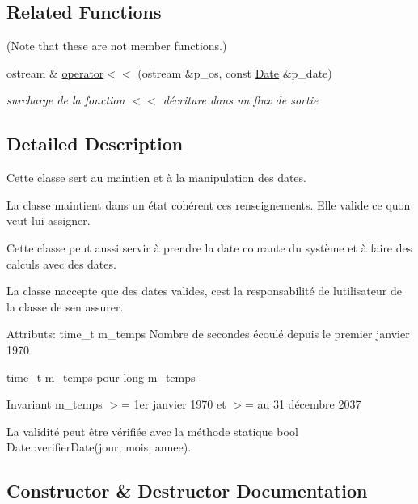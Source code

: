 \subsection*{Related Functions}
(Note that these are not member functions.) \begin{DoxyCompactItemize}
\item 
ostream \& \hyperlink{classutil_1_1Date_a3b88f9a1692395518a45b282a19f10e8}{operator$<$$<$} (ostream \&p\+\_\+os, const \hyperlink{classutil_1_1Date}{Date} \&p\+\_\+date)
\begin{DoxyCompactList}\small\item\em surcharge de la fonction $<$$<$ d\textquotesingle{}écriture dans un flux de sortie \end{DoxyCompactList}\end{DoxyCompactItemize}


\subsection{Detailed Description}
Cette classe sert au maintien et à la manipulation des dates. 

La classe maintient dans un état cohérent ces renseignements. Elle valide ce qu\textquotesingle{}on veut lui assigner. 

Cette classe peut aussi servir à prendre la date courante du système et à faire des calculs avec des dates. 

La classe n\textquotesingle{}accepte que des dates valides, c\textquotesingle{}est la responsabilité de l\textquotesingle{}utilisateur de la classe de s\textquotesingle{}en assurer. 

Attributs\+: time\+\_\+t m\+\_\+temps Nombre de secondes écoulé depuis le premier janvier 1970 

time\+\_\+t m\+\_\+temps pour long m\+\_\+temps \begin{DoxyInvariant}{Invariant}
m\+\_\+temps $>$= 1er janvier 1970 et $>$= au 31 décembre 2037 

La validité peut être vérifiée avec la méthode statique bool Date\+::verifier\+Date(jour, mois, annee). 
\end{DoxyInvariant}


\subsection{Constructor \& Destructor Documentation}
\mbox{\label{classutil_1_1Date_a06b8340e5beed84c885c89d41a750330}} 
